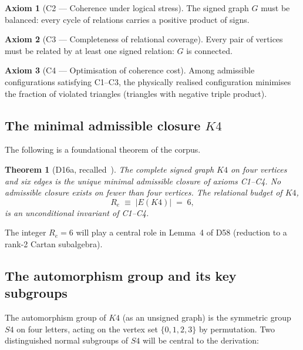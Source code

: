 \documentclass[11pt,a4paper]{article}
\def\Sfour{S4}%
\def\Kfour{K4}%
\def\Re{Re}%
\theoremstyle{plain}
\newtheorem{theorem}{Theorem}[section]
\theoremstyle{definition}
\newtheorem{axiom}{Axiom}
\theoremstyle{remark}
\newcommand{\Kfour}{K_4}
\newcommand{\Sfour}{S_4}
\renewcommand{\Re}{R_e}
\begin{document}
\begin{axiom}[C2 --- Coherence under logical stress]
The signed graph $G$ must be balanced: every cycle of relations carries a positive product of signs.
\end{axiom}

\begin{axiom}[C3 --- Completeness of relational coverage]
Every pair of vertices must be related by at least one signed relation: $G$ is connected.
\end{axiom}

\begin{axiom}[C4 --- Optimisation of coherence cost]
Among admissible configurations satisfying C1--C3, the physically realised configuration minimises the fraction of violated triangles (triangles with negative triple product).
\end{axiom}

\subsection{The minimal admissible closure \texorpdfstring{$\Kfour$}{K4}}
\label{subsec:K4}

The following is a foundational theorem of the corpus.

\begin{theorem}[D16a, recalled~\cite{PDL_D16a}]
\label{thm:K4_uniqueness}
The complete signed graph $\Kfour$ on four vertices and six edges is the unique minimal admissible closure of axioms C1--C4. No admissible closure exists on fewer than four vertices. The relational budget of $\Kfour$,
\begin{equation}
\Re \;\equiv\; |E(\Kfour)| \;=\; 6,
\end{equation}
is an unconditional invariant of C1--C4.
\end{theorem}

The integer $\Re = 6$ will play a central role in Lemma~4 of D58 (reduction to a rank-2 Cartan subalgebra).

\subsection{The automorphism group and its key subgroups}
\label{subsec:S4_V4_A4}

The automorphism group of $\Kfour$ (as an unsigned graph) is the symmetric group $\Sfour$ on four letters, acting on the vertex set $\{0,1,2,3\}$ by permutation. Two distinguished normal subgroups of $\Sfour$ will be central to the derivation:
\end{document}
